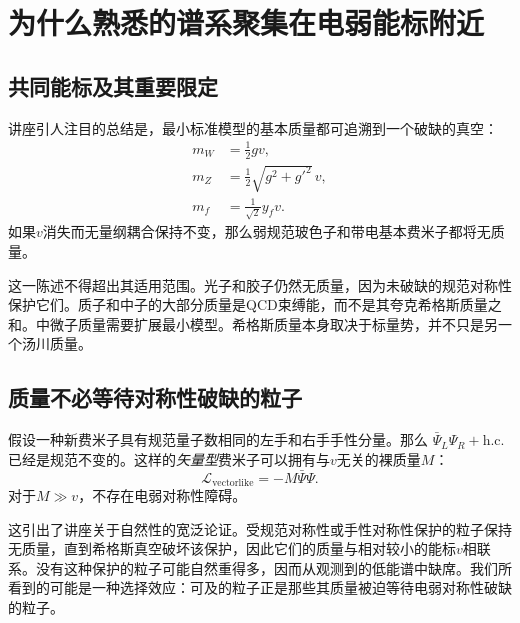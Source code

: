 \section{为什么熟悉的谱系聚集在电弱能标附近}

\subsection{共同能标及其重要限定}

\begin{classroomqa}
\end{classroomqa}

讲座引人注目的总结是，最小标准模型的基本质量都可追溯到一个破缺的真空：
\begin{align}
  m_W&=\frac12gv,\\
  m_Z&=\frac12\sqrt{g^2+g'^2}\,v,\\
  m_f&=\frac1{\sqrt2}y_fv.
  \label{eq:l09-electroweak-mass-summary}
\end{align}
如果\(v\)消失而无量纲耦合保持不变，那么弱规范玻色子和带电基本费米子都将无质量。

这一陈述不得超出其适用范围。光子和胶子仍然无质量，因为未破缺的规范对称性保护它们。质子和中子的大部分质量是QCD束缚能，而不是其夸克希格斯质量之和。中微子质量需要扩展最小模型。希格斯质量本身取决于标量势，并不只是另一个汤川质量。

\subsection{质量不必等待对称性破缺的粒子}

假设一种新费米子具有规范量子数相同的左手和右手手性分量。那么
\(\bar\Psi_L\Psi_R+\mathrm{h.c.}\)已经是规范不变的。这样的\emph{矢量型}费米子可以拥有与\(v\)无关的裸质量\(M\)：
\begin{equation}
  \mathcal L_{\mathrm{vectorlike}}
  =-M\bar\Psi\Psi.
  \label{eq:l09-vectorlike-mass}
\end{equation}
对于\(M\gg v\)，不存在电弱对称性障碍。

这引出了讲座关于自然性的宽泛论证。受规范对称性或手性对称性保护的粒子保持无质量，直到希格斯真空破坏该保护，因此它们的质量与相对较小的能标\(v\)相联系。没有这种保护的粒子可能自然重得多，因而从观测到的低能谱中缺席。我们所看到的可能是一种选择效应：可及的粒子正是那些其质量被迫等待电弱对称性破缺的粒子。

